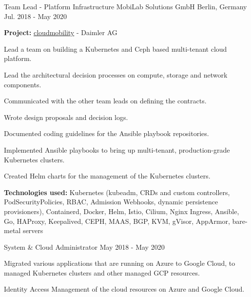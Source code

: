 
\begin{cventries}

    \cventry
    {Team Lead - Platform Infrastructure}
    {MobiLab Solutions GmbH}
    {Berlin, Germany}
    {Jul. 2018 - May 2020}
    {
    \begin{cvitems}
        \item {\textbf{Project:} \href{https://cloudmobility.io}{cloudmobility} - Daimler AG}
        \newline
        \item {Lead a team on building a Kubernetes and Ceph based multi-tenant cloud platform.}
        \item {Lead the architectural decision processes on compute, storage and network components.}
        \item {Communicated with the other team leads on defining the contracts.}
        \item {Wrote design proposals and decision logs.}
        \item {Documented coding guidelines for the Ansible playbook repositories.}
        \item {
        Implemented Ansible playbooks to bring up multi-tenant,
        production-grade Kubernetes clusters.
        }
        \item {Created Helm charts for the management of the Kubernetes clusters.}
        \smallskip
        \item {
        \textbf{Technologies used:} Kubernetes (kubeadm, CRDs and custom controllers,
        PodSecurityPolicies, RBAC, Admission Webhooks, dynamic persistence provisioners),
        Containerd, Docker, Helm, Istio, Cilium, Nginx Ingress, Ansible, Go,
        HAProxy, Keepalived, CEPH, MAAS, BGP, KVM, gVisor, AppArmor, bare-metal servers
        }
    \end{cvitems}
    }

    \cventry
    {System \& Cloud Administrator}
    {}
    {}
    {May 2018 - May 2020}
    {
    \begin{cvitems}
        \item {
        Migrated various applications that are running on Azure to Google Cloud,
        to managed Kubernetes clusters and other managed GCP resources.
        }
        \item {Identity Access Management of the cloud resources on Azure and Google Cloud.}
    \end{cvitems}
    }


\end{cventries}
